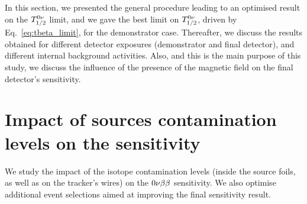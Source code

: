 
In this section, we presented the general procedure leading to an optimised result on the $T_{1/2}^{0\nu}$ limit, and we gave the best limit on $T_{1/2}^{0\nu}$, driven by Eq.~\eqref{eq:tbeta_limit}, for the demonstrator case.
Thereafter, we discuss the results obtained for different detector exposures (demonstrator and final detector), and different internal background activities.
Also, and this is the main purpose of this study, we discuss the influence of the presence of the magnetic field on the final detector's sensitivity.


\section{Impact of sources contamination levels on the sensitivity}
\label{sec:demonstrator_sensitivity}

We study the impact of the isotope contamination levels (inside the source foils, as well as on the tracker's wires) on the $0\nu\beta\beta$ sensitivity.
We also optimise additional event selections aimed at improving the final sensitivity result.

